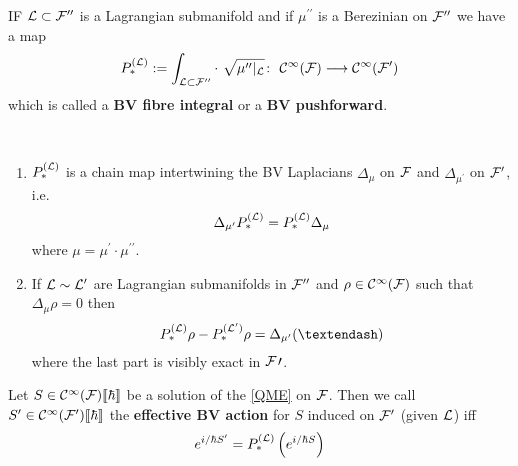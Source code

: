\begin{definition}
  IF $\mathcal{L} \subset {\mathcal{F}}^{\prime\prime}$ is a Lagrangian submanifold and if $\mu^{\prime\prime}$ is a Berezinian on ${\mathcal{F}}^{\prime\prime}$ we have a map
  \begin{equation}
    P_*^{(\mathcal{L})} := \int_{\mathcal{L} \subset {\mathcal{F}}^{\prime\prime}} \cdot \ \sqrt{\mu^{\prime\prime}|_{\mathcal{L}}} \colon \ \mathcal{C}^{\infty}({\mathcal{F}}) \longrightarrow \mathcal{C}^{\infty}({\mathcal{F}}^\prime)
  \end{equation}
  which is called a \textbf{BV fibre integral} or a \textbf{BV pushforward}.
\end{definition}

\begin{theo}~
  \begin{enumerate}
    \item $P_*^{(\mathcal{L})}$ is a chain map intertwining the BV Laplacians $\Delta_\mu$ on ${\mathcal{F}}$ and $\Delta_{\mu^\prime}$ on ${\mathcal{F}}^\prime$, i.e.
    \begin{equation}
      \Delta_{\mu^\prime} P_*^{(\mathcal{L})} = P_*^{(\mathcal{L})} \Delta_\mu
    \end{equation}
    where $\mu = \mu^\prime \cdot \mu^{\prime\prime}$.

    \item If $\mathcal{L} \sim \mathcal{L}^\prime$ are Lagrangian submanifolds in ${\mathcal{F}}^{\prime\prime}$ and $\rho \in \mathcal{C}^{\infty}({\mathcal{F}})$ such that $\Delta_\mu \rho = 0$ then
    \begin{equation}
      P_*^{(\LL)} \rho - P_*^{(\LL^\prime)} \rho = \Delta_{\mu^\prime}( – )
    \end{equation}
    where the last part is visibly exact in ${\mathcal{F}} \prime$.
  \end{enumerate}
\end{theo}


\begin{definition}
  Let $S \in \mathcal{C}^{\infty}({\mathcal{F}})\llbracket\hbar\rrbracket$ be a solution of the \eqref{QME} on ${\mathcal{F}}$. Then we call $S^\prime \in \mathcal{C}^{\infty}({\mathcal{F}}^\prime)\llbracket\hbar\rrbracket$ the \textbf{effective BV action} for $S$ induced on ${\mathcal{F}}^\prime$ (given $\mathcal{L}$) iff
  \begin{equation}
    e^{i/\hbar S^\prime} = P_*^{(\mathcal{L})} \left( e^{i/\hbar S} \right)
  \end{equation}
\end{definition}

